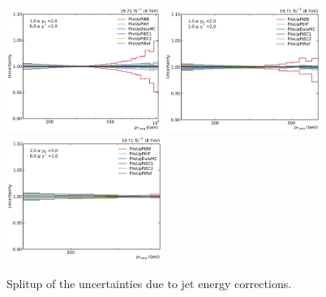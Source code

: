 \begin{figure}[htbp]
    \includegraphics[width=0.45\textwidth]{figures/measurement/jec_relunc_5_yb1ys0.pdf}
    \includegraphics[width=0.45\textwidth]{figures/measurement/jec_relunc_5_yb1ys1.pdf}\hfill
    \includegraphics[width=0.45\textwidth]{figures/measurement/jec_relunc_5_yb2ys0.pdf}
    \caption{Splitup of the uncertainties due to jet energy corrections.}
    \label{fig:jec_relunc_5}
\end{figure}

